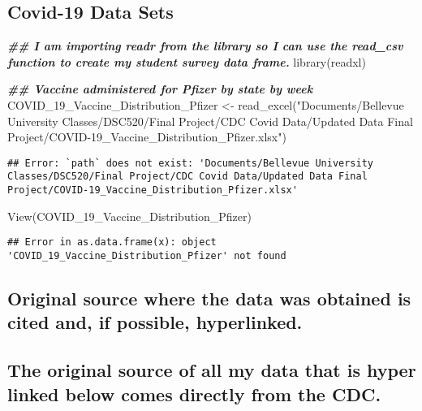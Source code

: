 \documentclass[
]{article}
\newenvironment{Shaded}{\begin{snugshade}}{\end{snugshade}}
\newcommand{\DocumentationTok}[1]{\textcolor[rgb]{0.56,0.35,0.01}{\textbf{\textit{#1}}}}
\newcommand{\FunctionTok}[1]{\textcolor[rgb]{0.00,0.00,0.00}{#1}}
\newcommand{\NormalTok}[1]{#1}
\newcommand{\OtherTok}[1]{\textcolor[rgb]{0.56,0.35,0.01}{#1}}
\newcommand{\StringTok}[1]{\textcolor[rgb]{0.31,0.60,0.02}{#1}}
\begin{document}
\hypertarget{covid-19-data-sets}{%
\subsection{Covid-19 Data Sets}\label{covid-19-data-sets}}

\begin{Shaded}
\begin{Highlighting}[]
\DocumentationTok{\#\# I am importing readr from the library so I can use the read\_csv function to create my student survey data frame.}
\FunctionTok{library}\NormalTok{(readxl)}

\DocumentationTok{\#\# Vaccine administered for Pfizer by state by week}
\NormalTok{COVID\_19\_Vaccine\_Distribution\_Pfizer }\OtherTok{\textless{}{-}} \FunctionTok{read\_excel}\NormalTok{(}\StringTok{"Documents/Bellevue University Classes/DSC520/Final Project/CDC Covid Data/Updated Data Final Project/COVID{-}19\_Vaccine\_Distribution\_Pfizer.xlsx"}\NormalTok{)}
\end{Highlighting}
\end{Shaded}

\begin{verbatim}
## Error: `path` does not exist: 'Documents/Bellevue University Classes/DSC520/Final Project/CDC Covid Data/Updated Data Final Project/COVID-19_Vaccine_Distribution_Pfizer.xlsx'
\end{verbatim}

\begin{Shaded}
\begin{Highlighting}[]
\FunctionTok{View}\NormalTok{(COVID\_19\_Vaccine\_Distribution\_Pfizer) }
\end{Highlighting}
\end{Shaded}

\begin{verbatim}
## Error in as.data.frame(x): object 'COVID_19_Vaccine_Distribution_Pfizer' not found
\end{verbatim}

\hypertarget{original-source-where-the-data-was-obtained-is-cited-and-if-possible-hyperlinked.}{%
\subsection{Original source where the data was obtained is cited and, if
possible,
hyperlinked.}\label{original-source-where-the-data-was-obtained-is-cited-and-if-possible-hyperlinked.}}

\hypertarget{the-original-source-of-all-my-data-that-is-hyper-linked-below-comes-directly-from-the-cdc.}{%
\subsection{The original source of all my data that is hyper linked
below comes directly from the
CDC.}\label{the-original-source-of-all-my-data-that-is-hyper-linked-below-comes-directly-from-the-cdc.}}
\end{document}
